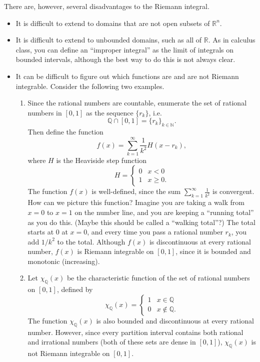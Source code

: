 \documentclass[12pt]{amsart}         %
\theoremstyle{remark}
\newcommand{\N}{\mathbb{N}}
\newcommand{\R}{\mathbb{R}}
\newcommand{\Q}{\mathbb{Q}}
\begin{document}
There are, however, several disadvantages to the Riemann integral.

\begin{itemize}
    \item It is difficult to extend to domains that are not open subsets of $\R^n$.
    \item It is difficult to extend to unbounded domains, such as all of $\R$. As in calculus class, you can define an ``improper integral'' as the limit of integrals on bounded intervals, although the best way to do this is not always clear.
    \item It can be difficult to figure out which functions are and are not Riemann integrable.
    Consider the following two examples.
    \begin{enumerate}
        \item Since the rational numbers are countable, enumerate the set of rational numbers in $[0, 1]$ as the sequence $\{ r_k \}$, i.e.
        \[
        \Q \cap [0, 1] = \{ r_k \}_{k \in \N}.
        \]
        Then define the function
        \[
        f(x) = \sum_{k=1}^\infty \frac{1}{k^2}H(x - r_k),
        \]
        where $H$ is the Heaviside step function
        \[
        H = \begin{cases}
        0 & x < 0 \\
        1 & x \geq 0.
        \end{cases}
        \]
        The function $f(x)$ is well-defined, since the sum $\sum_{k=1}^\infty \frac{1}{k^2}$ is convergent. How can we picture this function? Imagine you are taking a walk from $x=0$ to $x=1$ on the number line, and you are keeping a ``running total'' as you do this. (Maybe this should be called a ``walking total''?) The total starts at 0 at $x=0$, and every time you pass a rational number $r_k$, you add $1/k^2$ to the total. Although $f(x)$ is discontinuous at every rational number, $f(x)$ is Riemann integrable on $[0, 1]$, since it is bounded and monotonic (increasing).
        \item Let $\chi_\Q(x)$ be the characteristic function of the set of rational numbers on $[0, 1]$, defined by
        \[
        \chi_\Q(x) = 
        \begin{cases}
        1 & x \in \Q \\
        0 & x \notin \Q.
        \end{cases}
        \]
        The function $\chi_\Q(x)$ is also bounded and discontinuous at every rational number. However, since every partition interval contains both rational and irrational numbers (both of these sets are dense in $[0,1]$), $\chi_\Q(x)$ is not Riemann integrable on $[0, 1]$.
    \end{enumerate}
    

\end{itemize}
\end{document}
